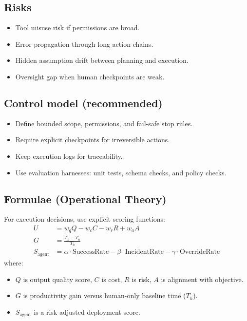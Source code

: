 \documentclass[10pt]{article}
\begin{document}
\subsection*{Risks}
\begin{itemize}
  \item Tool misuse risk if permissions are broad.
  \item Error propagation through long action chains.
  \item Hidden assumption drift between planning and execution.
  \item Oversight gap when human checkpoints are weak.
\end{itemize}

\subsection*{Control model (recommended)}
\begin{itemize}
  \item Define bounded scope, permissions, and fail-safe stop rules.
  \item Require explicit checkpoints for irreversible actions.
  \item Keep execution logs for traceability.
  \item Use evaluation harnesses: unit tests, schema checks, and policy checks.
\end{itemize}

\subsection*{Formulae (Operational Theory)}
For execution decisions, use explicit scoring functions:
\begin{align*}
U &= w_q Q - w_c C - w_r R + w_a A \\
G &= \frac{T_h - T_a}{T_h} \\
S_{\text{agent}} &= \alpha \cdot \text{SuccessRate} - \beta \cdot \text{IncidentRate} - \gamma \cdot \text{OverrideRate}
\end{align*}
where:
\begin{itemize}
  \item $Q$ is output quality score, $C$ is cost, $R$ is risk, $A$ is alignment with objective.
  \item $G$ is productivity gain versus human-only baseline time ($T_h$).
  \item $S_{\text{agent}}$ is a risk-adjusted deployment score.
\end{itemize}
\end{document}
